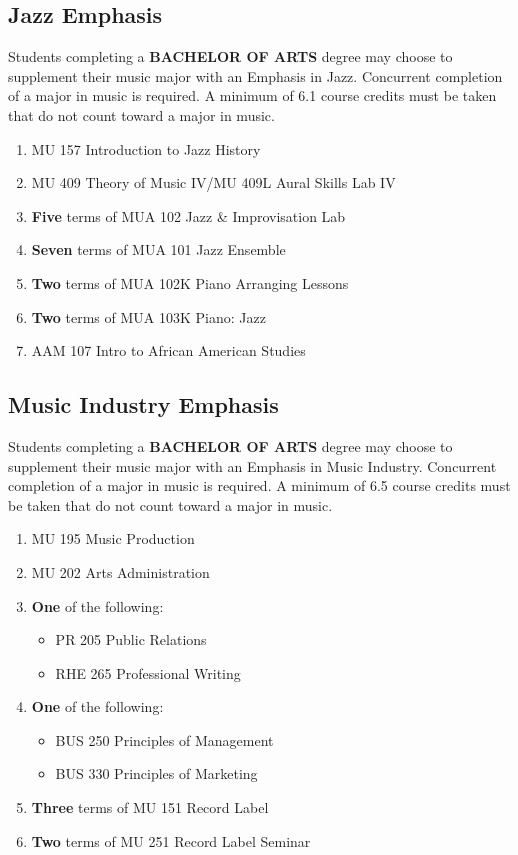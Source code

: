 \documentclass[
  letterpaper,
]{scrbook}
\providecommand{\tightlist}{%
  \setlength{\itemsep}{0pt}\setlength{\parskip}{0pt}}
\begin{document}
\subsection{Jazz Emphasis}\label{jazz-emphasis}

Students completing a \textbf{BACHELOR OF ARTS} degree may choose to
supplement their music major with an Emphasis in Jazz. Concurrent
completion of a major in music is required. A minimum of 6.1 course
credits must be taken that do not count toward a major in music.

\begin{enumerate}
\def\labelenumi{\arabic{enumi}.}
\tightlist
\item
  MU 157 Introduction to Jazz History
\item
  MU 409 Theory of Music IV/MU 409L Aural Skills Lab IV
\item
  \textbf{Five} terms of MUA 102 Jazz \& Improvisation Lab
\item
  \textbf{Seven} terms of MUA 101 Jazz Ensemble
\item
  \textbf{Two} terms of MUA 102K Piano Arranging Lessons
\item
  \textbf{Two} terms of MUA 103K Piano: Jazz
\item
  AAM 107 Intro to African American Studies
\end{enumerate}

\subsection{Music Industry Emphasis}\label{music-industry-emphasis}

Students completing a \textbf{BACHELOR OF ARTS} degree may choose to
supplement their music major with an Emphasis in Music Industry.
Concurrent completion of a major in music is required. A minimum of 6.5
course credits must be taken that do not count toward a major in music.

\begin{enumerate}
\def\labelenumi{\arabic{enumi}.}
\tightlist
\item
  MU 195 Music Production
\item
  MU 202 Arts Administration
\item
  \textbf{One} of the following:

  \begin{itemize}
  \tightlist
  \item
    PR 205 Public Relations
  \item
    RHE 265 Professional Writing
  \end{itemize}
\item
  \textbf{One} of the following:

  \begin{itemize}
  \tightlist
  \item
    BUS 250 Principles of Management
  \item
    BUS 330 Principles of Marketing
  \end{itemize}
\item
  \textbf{Three} terms of MU 151 Record Label
\item
  \textbf{Two} terms of MU 251 Record Label Seminar
\end{enumerate}
\end{document}
